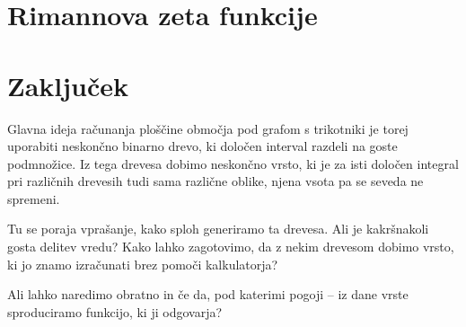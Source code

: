 \documentclass[a4paper, 12pt, titlepage]{article}
\begin{document}
\section{Rimannova zeta funkcije}




\newpage
\section{Zaključek}

Glavna ideja računanja ploščine območja pod grafom s trikotniki je torej uporabiti neskončno binarno drevo, ki določen interval razdeli na goste podmnožice. Iz tega drevesa dobimo neskončno vrsto, ki je za isti določen integral pri različnih drevesih tudi sama različne oblike, njena vsota pa se seveda ne spremeni.

Tu se poraja vprašanje, kako sploh generiramo ta drevesa. Ali je kakršnakoli gosta delitev vredu? Kako lahko zagotovimo, da z nekim drevesom dobimo vrsto, ki jo znamo izračunati brez pomoči kalkulatorja?

Ali lahko naredimo obratno in če da, pod katerimi pogoji -- iz dane vrste sproduciramo funkcijo, ki ji odgovarja?



\newpage
\newpage
\nocite{*}      %
\printbibliography
\end{document}
